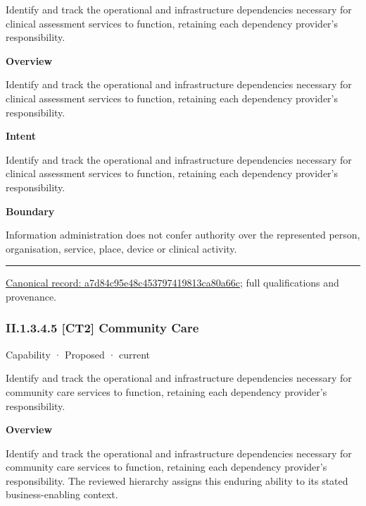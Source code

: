 Identify and track the operational and infrastructure dependencies necessary for clinical assessment services to function, retaining each dependency provider's responsibility.



\textbf{Overview}



Identify and track the operational and infrastructure dependencies necessary for clinical assessment services to function, retaining each dependency provider's responsibility.



\textbf{Intent}



Identify and track the operational and infrastructure dependencies necessary for clinical assessment services to function, retaining each dependency provider's responsibility.



\textbf{Boundary}



Information administration does not confer authority over the represented person, organisation, service, place, device or clinical activity.



\medskip\hrule\medskip

{\footnotesize \href{../../../../continuum/strategy/capability/a7d84c95e48c453797419813ca80a66c.md}{Canonical record: a7d84c95e48c453797419813ca80a66c}; full qualifications and provenance.}\par
\subsubsection*{II.1.3.4.5 [CT2] Community Care}
\label{navigation:II.1.3.4.5}

\label{element:942aa78cad004ef99de6b3aae8ddd014}
{\small Capability · Proposed · current}\par

Identify and track the operational and infrastructure dependencies necessary for community care services to function, retaining each dependency provider's responsibility.



\textbf{Overview}



Identify and track the operational and infrastructure dependencies necessary for community care services to function, retaining each dependency provider's responsibility. The reviewed hierarchy assigns this enduring ability to its stated business-enabling context.



